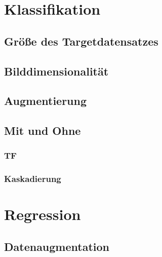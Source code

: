 \documentclass[ngerman]{report}
\begin{document}
    \chapter{Klassifikation}  %
    
    \section{Größe des Targetdatensatzes}
    
    \section{Bilddimensionalität}
    
    \section{Augmentierung}
    
    \section{Mit und Ohne}
    \subsection{TF}
    
    \subsection{Kaskadierung}
    


    \chapter{Regression}  %
    
    \section{Datenaugmentation}
    
\end{document}
